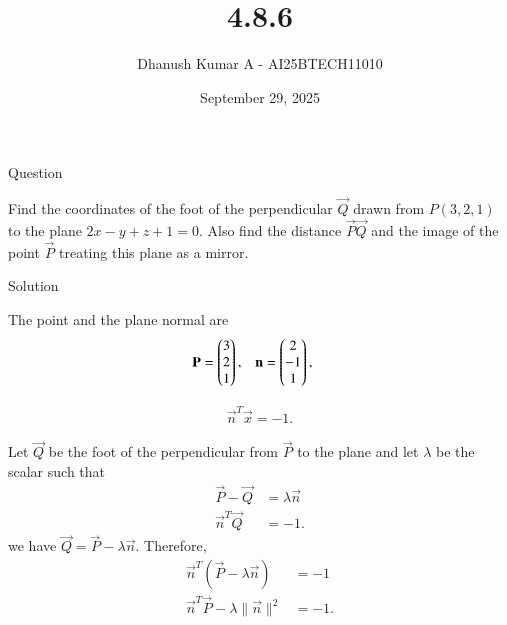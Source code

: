 \documentclass{beamer}
\title 
{4.8.6}
\date{September 29, 2025}
\author 
{Dhanush Kumar A - AI25BTECH11010}
\begin{document}
\frame{\titlepage}
\begin{frame}{Question}

Find the coordinates of the foot of the perpendicular $\vec{Q}$ drawn from $P(3,2,1)$ to the
plane $2x - y + z + 1 = 0$. Also find the distance $\vec{P}\vec{Q}$ and the image of the point $\vec{P}$
treating this plane as a mirror.
\end{frame}
\begin{frame}{Solution}

The point and the plane normal are
\begin{align}
\mathbf{P} &= \begin{pmatrix}3\\2\\1\end{pmatrix}, & \mathbf{n} &= \begin{pmatrix}2\\-1\\1\end{pmatrix},
\end{align}

\begin{align}
\vec{n}^T\vec{x} = -1.
\end{align}

Let $\vec{Q}$ be the foot of the perpendicular from $\vec{P}$ to the plane and let $\lambda$ be the scalar such that
\begin{align}
\vec{P}-\vec{Q} &= \lambda\vec{n}\\
\vec{n}^T\vec{Q} &= -1. 
\end{align}
 we have $\vec{Q}=\vec{P}-\lambda\vec{n}$.
 Therefore,
\begin{align}
\vec{n}^T(\vec{P}-\lambda\vec{n}) &= -1 \\
\vec{n}^T\vec{P} - \lambda\|\vec{n}\|^2 &= -1.
\end{align}
\end{frame}
\end{document}
